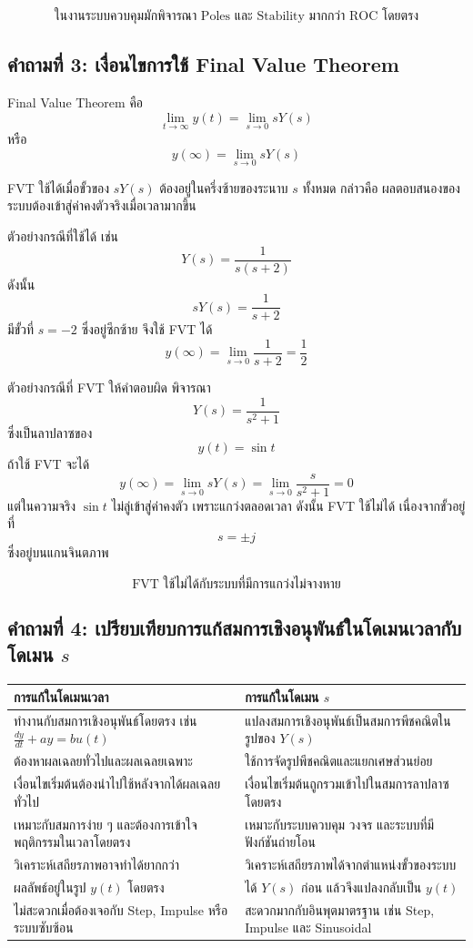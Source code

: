 \[
\boxed{\text{ในงานระบบควบคุมมักพิจารณา Poles และ Stability มากกว่า ROC โดยตรง}}
\]

\subsection{คำถามที่ 3: เงื่อนไขการใช้ Final Value Theorem}

Final Value Theorem คือ
\[
\lim_{t\to\infty}y(t)=\lim_{s\to 0}sY(s)
\]
หรือ
\[
\boxed{y(\infty)=\lim_{s\to 0}sY(s)}
\]

FVT ใช้ได้เมื่อขั้วของ $sY(s)$ ต้องอยู่ในครึ่งซ้ายของระนาบ $s$ ทั้งหมด กล่าวคือ ผลตอบสนองของระบบต้องเข้าสู่ค่าคงตัวจริงเมื่อเวลามากขึ้น

ตัวอย่างกรณีที่ใช้ได้ เช่น
\[
Y(s)=\frac{1}{s(s+2)}
\]
ดังนั้น
\[
sY(s)=\frac{1}{s+2}
\]
มีขั้วที่ $s=-2$ ซึ่งอยู่ซีกซ้าย จึงใช้ FVT ได้
\[
y(\infty)=\lim_{s\to 0}\frac{1}{s+2}=\frac{1}{2}
\]

ตัวอย่างกรณีที่ FVT ให้คำตอบผิด พิจารณา
\[
Y(s)=\frac{1}{s^2+1}
\]
ซึ่งเป็นลาปลาซของ
\[
y(t)=\sin t
\]
ถ้าใช้ FVT จะได้
\[
y(\infty)=\lim_{s\to 0}sY(s)=\lim_{s\to 0}\frac{s}{s^2+1}=0
\]
แต่ในความจริง $\sin t$ ไม่ลู่เข้าสู่ค่าคงตัว เพราะแกว่งตลอดเวลา ดังนั้น FVT ใช้ไม่ได้ เนื่องจากขั้วอยู่ที่
\[
s=\pm j
\]
ซึ่งอยู่บนแกนจินตภาพ

\[
\boxed{\text{FVT ใช้ไม่ได้กับระบบที่มีการแกว่งไม่จางหาย}}
\]

\subsection{คำถามที่ 4: เปรียบเทียบการแก้สมการเชิงอนุพันธ์ในโดเมนเวลากับโดเมน $s$}

\begin{center}
\begin{tabular}{p{}p{}}
\hline
\textbf{การแก้ในโดเมนเวลา} & \textbf{การแก้ในโดเมน $s$} \\
\hline
ทำงานกับสมการเชิงอนุพันธ์โดยตรง เช่น $\frac{dy}{dt}+ay=bu(t)$ & แปลงสมการเชิงอนุพันธ์เป็นสมการพีชคณิตในรูปของ $Y(s)$ \\
ต้องหาผลเฉลยทั่วไปและผลเฉลยเฉพาะ & ใช้การจัดรูปพีชคณิตและแยกเศษส่วนย่อย \\
เงื่อนไขเริ่มต้นต้องนำไปใช้หลังจากได้ผลเฉลยทั่วไป & เงื่อนไขเริ่มต้นถูกรวมเข้าไปในสมการลาปลาซโดยตรง \\
เหมาะกับสมการง่าย ๆ และต้องการเข้าใจพฤติกรรมในเวลาโดยตรง & เหมาะกับระบบควบคุม วงจร และระบบที่มีฟังก์ชันถ่ายโอน \\
วิเคราะห์เสถียรภาพอาจทำได้ยากกว่า & วิเคราะห์เสถียรภาพได้จากตำแหน่งขั้วของระบบ \\
ผลลัพธ์อยู่ในรูป $y(t)$ โดยตรง & ได้ $Y(s)$ ก่อน แล้วจึงแปลงกลับเป็น $y(t)$ \\
ไม่สะดวกเมื่อต้องเจอกับ Step, Impulse หรือระบบซับซ้อน & สะดวกมากกับอินพุตมาตรฐาน เช่น Step, Impulse และ Sinusoidal \\
\hline
\end{tabular}
\end{center}

